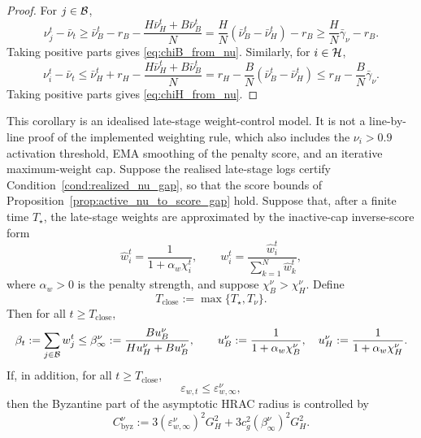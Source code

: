 \begin{proof}
For \(j\in\mathcal{B}\),
\[
    \nu_j^t-\bar\nu_t
    \ge
    \bar\nu_B^t-r_B
    -
    \frac{H\bar\nu_H^t+B\bar\nu_B^t}{N}
    =
    \frac{H}{N}(\bar\nu_B^t-\bar\nu_H^t)-r_B
    \ge
    \frac{H}{N}\bar\gamma_\nu-r_B.
\]
Taking positive parts gives \eqref{eq:chiB_from_nu}. Similarly, for
\(i\in\mathcal{H}\),
\[
    \nu_i^t-\bar\nu_t
    \le
    \bar\nu_H^t+r_H
    -
    \frac{H\bar\nu_H^t+B\bar\nu_B^t}{N}
    =
    r_H-\frac{B}{N}(\bar\nu_B^t-\bar\nu_H^t)
    \le
    r_H-\frac{B}{N}\bar\gamma_\nu.
\]
Taking positive parts gives \eqref{eq:chiH_from_nu}.
\end{proof}

\begin{corollary}
\label{cor:nu_gap_closed_beta}
This corollary is an idealised late-stage weight-control model. It is not a
line-by-line proof of the implemented weighting rule, which also includes the
\(\nu_i>0.9\) activation threshold, EMA smoothing of the penalty score, and an
iterative maximum-weight cap. Suppose the realised late-stage logs certify
Condition~\ref{cond:realized_nu_gap}, so that the score bounds of
Proposition~\ref{prop:active_nu_to_score_gap} hold. Suppose that, after a
finite time \(T_\star\), the late-stage weights are approximated by the
inactive-cap inverse-score form
\[
    \hat w_i^t=\frac{1}{1+\alpha_w \chi_i^t},
    \qquad
    w_i^t=\frac{\hat w_i^t}{\sum_{k=1}^N\hat w_k^t},
\]
where \(\alpha_w>0\) is the penalty strength, and suppose
\(\chi_B^\nu>\chi_H^\nu\). Define
\[
    T_{\mathrm{close}}:=\max\{T_\star,T_\nu\}.
\]
Then for all \(t\ge T_{\mathrm{close}}\),
\begin{equation}
    \beta_t
    :=
    \sum_{j\in\mathcal{B}}w_j^t
    \le
    \beta_\infty^\nu
    :=
    \frac{B u_B^\nu}{H u_H^\nu+B u_B^\nu},
    \qquad
    u_B^\nu:=\frac{1}{1+\alpha_w \chi_B^\nu},
    \quad
    u_H^\nu:=\frac{1}{1+\alpha_w \chi_H^\nu}.
    \label{eq:beta_nu_closed}
\end{equation}
If, in addition, for all \(t\ge T_{\mathrm{close}}\),
\[
    \varepsilon_{w,t}\le \varepsilon_{w,\infty}^\nu,
\]
then the Byzantine part of the asymptotic HRAC radius is controlled by
\begin{equation}
    C_{\mathrm{byz}}^\nu
    :=
    3(\varepsilon_{w,\infty}^\nu)^2G_H^2
    +
    3c_g^2(\beta_\infty^\nu)^2G_H^2.
    \label{eq:C_byz_nu_closed}
\end{equation}
\end{corollary}

